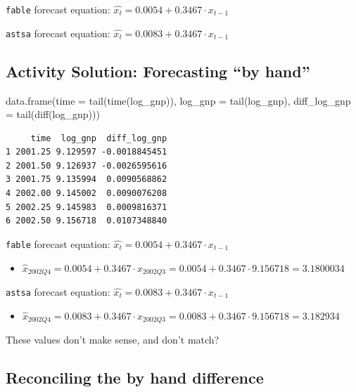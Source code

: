 \documentclass[
  letterpaper,
  DIV=11,
  numbers=noendperiod]{scrartcl}
\newenvironment{Shaded}{\begin{snugshade}}{\end{snugshade}}
\newcommand{\AttributeTok}[1]{\textcolor[rgb]{0.40,0.45,0.13}{#1}}
\newcommand{\FunctionTok}[1]{\textcolor[rgb]{0.28,0.35,0.67}{#1}}
\newcommand{\NormalTok}[1]{\textcolor[rgb]{0.00,0.23,0.31}{#1}}
\providecommand{\tightlist}{%
  \setlength{\itemsep}{0pt}\setlength{\parskip}{0pt}}\usepackage{longtable,booktabs,array}
\begin{document}
\texttt{fable} forecast equation:
\(\hat{x_t} = 0.0054 + 0.3467\cdot x_{t-1}\)

\texttt{astsa} forecast equation:
\(\hat{x_t} = 0.0083 + 0.3467\cdot x_{t-1}\)

\subsection{Activity Solution: Forecasting ``by
hand''}\label{activity-solution-forecasting-by-hand}

\begin{Shaded}
\begin{Highlighting}[]
\FunctionTok{data.frame}\NormalTok{(}\AttributeTok{time =} \FunctionTok{tail}\NormalTok{(}\FunctionTok{time}\NormalTok{(log\_gnp)), }\AttributeTok{log\_gnp =} \FunctionTok{tail}\NormalTok{(log\_gnp), }\AttributeTok{diff\_log\_gnp =} \FunctionTok{tail}\NormalTok{(}\FunctionTok{diff}\NormalTok{(log\_gnp)))}
\end{Highlighting}
\end{Shaded}

\begin{verbatim}
     time  log_gnp  diff_log_gnp
1 2001.25 9.129597 -0.0018845451
2 2001.50 9.126937 -0.0026595616
3 2001.75 9.135994  0.0090568862
4 2002.00 9.145002  0.0090076208
5 2002.25 9.145983  0.0009816371
6 2002.50 9.156718  0.0107348840
\end{verbatim}

\texttt{fable} forecast equation:
\(\hat{x_t} = 0.0054 + 0.3467\cdot x_{t-1}\)

\begin{itemize}
\tightlist
\item
  \(\hat{x}_{2002 Q4} = 0.0054 + 0.3467\cdot x_{2002 Q3} = 0.0054 + 0.3467\cdot 9.156718 = 3.1800034\)
\end{itemize}

\texttt{astsa} forecast equation:
\(\hat{x_t} = 0.0083 + 0.3467\cdot x_{t-1}\)

\begin{itemize}
\tightlist
\item
  \(\hat{x}_{2002 Q4} = 0.0083 + 0.3467\cdot x_{2002 Q3} = 0.0083 + 0.3467\cdot 9.156718 = 3.182934\)
\end{itemize}

These values don't make sense, and don't match?

\subsection{Reconciling the by hand
difference}\label{reconciling-the-by-hand-difference}
\end{document}
